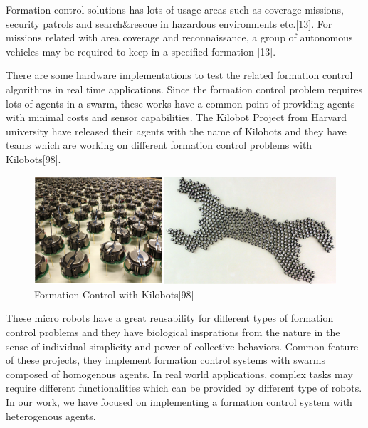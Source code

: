 Formation control solutions has lots of usage areas such as coverage missions, security patrols and search$\&$rescue in hazardous environments etc.[13]. For missions related with area coverage and reconnaissance, a group of autonomous vehicles may be required to keep in a specified formation [13].  

There are some hardware implementations to test the related formation control algorithms in real time applications. Since the formation control problem requires lots of agents in a swarm, these works have a common point of providing agents with minimal costs and sensor capabilities. The Kilobot Project from Harvard university have released their agents with the name of Kilobots and they have teams which are working on different formation control problems with Kilobots[98].

\begin{figure}[H]
\caption{Formation Control with Kilobots[98]}
\centering
\includegraphics[scale = 0.75]{kilobot}
\end{figure}

These micro robots have a great reusability for different types of formation control problems  and they have biological insprations from the nature in the sense of individual simplicity and power of collective behaviors. Common feature of these projects, they implement formation control systems with swarms composed of homogenous agents. In real world applications, complex tasks may require different functionalities which can be provided by different type of robots. In our work, we have focused on implementing a formation control system with heterogenous agents.


